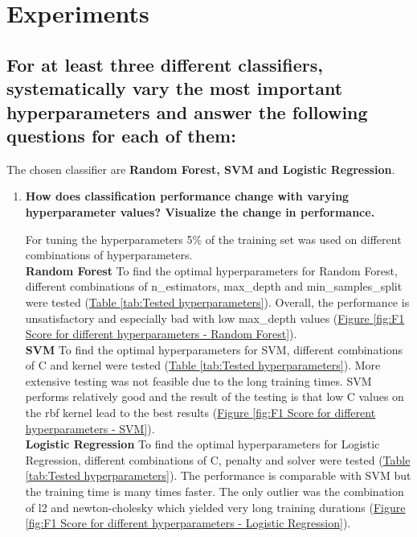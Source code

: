 
\section{Experiments}
\label{sec:Experiments}



\subsection{For at least three different classifiers, systematically vary the most important hyperparameters and answer the following questions for each of them: }
\label{sec:Experiments:a}

The chosen classifier are \textbf{Random Forest, SVM and Logistic Regression}.

\begin{enumerate}[label=\roman*.)]
\item \textbf{How does classification performance change with varying hyperparameter values? Visualize the
change in performance.}

For tuning the hyperparameters 5\% of the training set was used on different combinations of hyperparameters. \\

\textbf{Random Forest} \quad
To find the optimal hyperparameters for Random Forest, different combinations of n\_estimators, max\_depth and min\_samples\_split were tested (\hyperref[tab:Tested hyperparameters]{Table \ref{tab:Tested hyperparameters}}). Overall, the performance is  unsatisfactory and especially bad with low max\_depth values (\hyperref[fig:F1 Score for different hyperparameters - Random Forest]{Figure \ref*{fig:F1 Score for different hyperparameters - Random Forest}}). \\[-3pt]

\textbf{SVM} \quad
To find the optimal hyperparameters for SVM, different combinations of C and kernel  were tested (\hyperref[tab:Tested hyperparameters]{Table \ref*{tab:Tested hyperparameters}}). More extensive testing was not feasible due to the long training times. SVM performs relatively good and the result of the testing is that low C values on the rbf kernel lead to the best results (\hyperref[fig:F1 Score for different hyperparameters - SVM]{Figure \ref{fig:F1 Score for different hyperparameters - SVM}}). \\[-3pt]

\textbf{Logistic Regression} \quad
To find the optimal hyperparameters for Logistic Regression, different combinations of C, penalty and solver  were tested (\hyperref[tab:Tested hyperparameters]{Table \ref{tab:Tested hyperparameters}}). The performance is comparable with SVM but the training time is many times faster. The only outlier was the combination of l2 and newton-cholesky which yielded very long training durations (\hyperref[fig:F1 Score for different hyperparameters - Logistic Regression]{Figure \ref{fig:F1 Score for different hyperparameters - Logistic Regression}}). \\


\end{enumerate}
